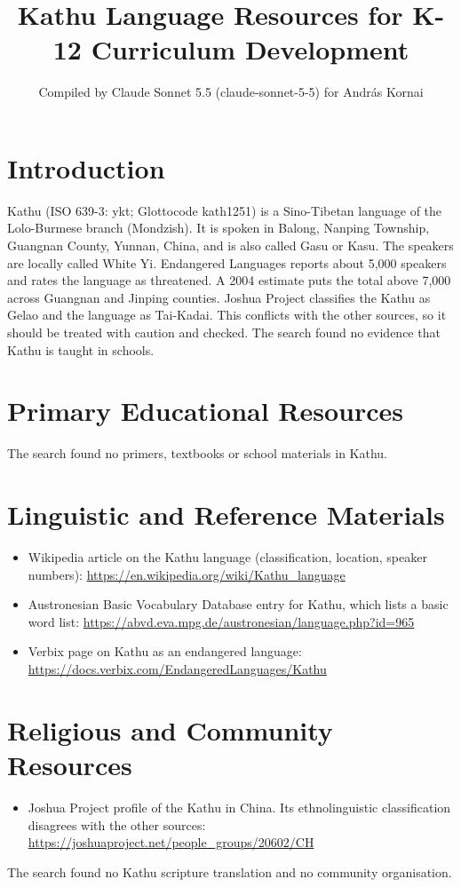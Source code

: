 \documentclass[12pt]{article}
\title{Kathu Language Resources for K-12 Curriculum Development}
\author{Compiled by Claude Sonnet 5.5 (claude-sonnet-5-5) for Andr\'as Kornai}
\date{}
\begin{document}
\maketitle

\section{Introduction}
Kathu (ISO 639-3: ykt; Glottocode kath1251) is a Sino-Tibetan language of the Lolo-Burmese branch (Mondzish). It is spoken in Balong, Nanping Township, Guangnan County, Yunnan, China, and is also called Gasu or Kasu. The speakers are locally called White Yi. Endangered Languages reports about 5,000 speakers and rates the language as threatened. A 2004 estimate puts the total above 7,000 across Guangnan and Jinping counties. Joshua Project classifies the Kathu as Gelao and the language as Tai-Kadai. This conflicts with the other sources, so it should be treated with caution and checked. The search found no evidence that Kathu is taught in schools.

\section{Primary Educational Resources}
The search found no primers, textbooks or school materials in Kathu.

\section{Linguistic and Reference Materials}
\begin{itemize}
\item Wikipedia article on the Kathu language (classification, location, speaker numbers): \url{https://en.wikipedia.org/wiki/Kathu_language}
\item Austronesian Basic Vocabulary Database entry for Kathu, which lists a basic word list: \url{https://abvd.eva.mpg.de/austronesian/language.php?id=965}
\item Verbix page on Kathu as an endangered language: \url{https://docs.verbix.com/EndangeredLanguages/Kathu}
\end{itemize}

\section{Religious and Community Resources}
\begin{itemize}
\item Joshua Project profile of the Kathu in China. Its ethnolinguistic classification disagrees with the other sources: \url{https://joshuaproject.net/people_groups/20602/CH}
\end{itemize}
The search found no Kathu scripture translation and no community organisation.
\end{document}
